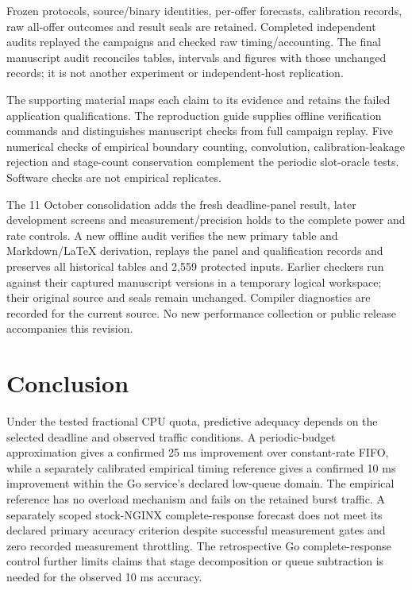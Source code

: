 \documentclass[11pt,a4paper]{article}
\begin{document}
Frozen protocols, source/binary identities, per-offer forecasts, calibration
records, raw all-offer outcomes and result seals are retained. Completed
independent audits replayed the campaigns and checked raw timing/accounting.
The final manuscript audit reconciles tables, intervals and figures with those
unchanged records; it is not another experiment or independent-host replication.

The supporting material maps each
claim to its evidence and retains the failed application qualifications. The
reproduction guide supplies offline
verification commands and distinguishes manuscript checks from full campaign
replay. Five numerical checks of empirical boundary counting, convolution,
calibration-leakage rejection and stage-count conservation complement the
periodic slot-oracle tests. Software checks are not empirical replicates.

The 11 October consolidation adds the fresh deadline-panel result, later
development screens and measurement/precision holds to the complete power and
rate controls. A new offline audit verifies the new primary table and
Markdown/LaTeX derivation, replays the panel and qualification records and
preserves all historical tables and 2,559 protected inputs. Earlier checkers
run against their captured manuscript versions in a temporary logical workspace;
their original source and seals remain unchanged. Compiler diagnostics are recorded for the current source.
No new performance collection or public release accompanies this revision.

\section{Conclusion}

Under the tested fractional CPU quota, predictive adequacy depends on the
selected deadline and observed traffic conditions. A periodic-budget
approximation gives a confirmed 25 ms improvement over constant-rate FIFO,
while a separately calibrated empirical timing reference gives a confirmed
10 ms improvement within the Go service's declared low-queue domain. The
empirical reference has no overload mechanism and fails on the retained burst
traffic. A separately scoped stock-NGINX complete-response forecast does not
meet its declared primary accuracy criterion despite successful measurement
gates and zero recorded measurement throttling. The retrospective Go
complete-response control further limits claims that stage decomposition or
queue subtraction is needed for the observed 10 ms accuracy.
\end{document}
